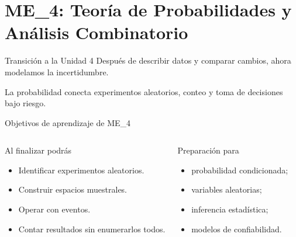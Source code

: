 \documentclass[aspectratio=169,11pt]{beamer}
\begin{document}
\part{ME\_4: Teoría de Probabilidades y Análisis Combinatorio}

\begin{frame}{Transición a la Unidad 4}
\centering
\Large
Después de describir datos y comparar cambios, ahora modelamos la incertidumbre.
\vspace{0.8em}

\normalsize
La probabilidad conecta experimentos aleatorios, conteo y toma de decisiones bajo riesgo.
\end{frame}

\begin{frame}{Objetivos de aprendizaje de ME\_4}
\begin{columns}[T]
\begin{block}{Al finalizar podrás}
\begin{itemize}
  \item Identificar experimentos aleatorios.
  \item Construir espacios muestrales.
  \item Operar con eventos.
  \item Contar resultados sin enumerarlos todos.
\end{itemize}
\end{block}
\begin{exampleblock}{Preparación para}
\begin{itemize}
  \item probabilidad condicionada;
  \item variables aleatorias;
  \item inferencia estadística;
  \item modelos de confiabilidad.
\end{itemize}
\end{exampleblock}
\end{columns}
\end{frame}
\end{document}
